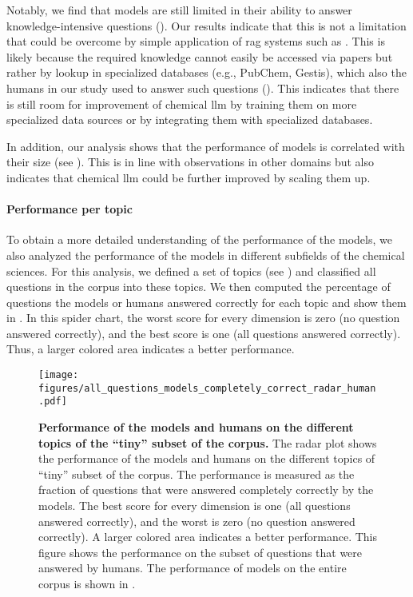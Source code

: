 \documentclass[11pt, oneside]{article}
\begin{document}
\begin{refsection}
Notably, we find that models are still limited in their ability to answer knowledge-intensive questions (). Our results indicate that this is not a limitation that could be overcome by simple application of \gls{rag} systems such as \PaperQATwo. This is likely because the required knowledge cannot easily be accessed via papers but rather by lookup in specialized databases (e.g., PubChem, Gestis), which also the humans in our study used to answer such questions ().
This indicates that there is still room for improvement of chemical \gls{llm} by training them on more specialized data sources or by integrating them with specialized databases.

In addition, our analysis shows that the performance of models is correlated with their size (see ). This is in line with observations in other domains but also indicates that chemical \gls{llm} could be further improved by scaling them up.

\paragraph{Performance per topic} To obtain a more detailed understanding of the performance of the models, we also analyzed the performance of the models in different subfields of the chemical sciences.
For this analysis, we defined a set of topics (see ) and  classified all questions in the \chembench corpus into these topics.
We then computed the percentage of questions the models or humans answered correctly for each topic and show them in .
In this spider chart, the worst score for every dimension is zero (no question answered correctly), and the best score is one (all questions answered correctly). Thus, a larger colored area indicates a better performance.

\begin{figure}[!h]
    \centering
    \texttt{[image: figures/all\_questions\_models\_completely\_correct\_radar\_human.pdf]}
    \caption{\textbf{Performance of the models and humans on the different topics of the \enquote{tiny} subset of the \chembench corpus.} The radar plot shows the performance of the models and humans on the different topics of \enquote{tiny} subset of the \chembench corpus. The performance is measured as the fraction of questions that were answered completely correctly by the models.
    The best score for every dimension is one (all questions answered correctly), and the worst is zero (no question answered correctly). A larger colored area indicates a better performance.
    This figure shows the performance on the subset of questions that were answered by humans. The performance of models on the entire corpus is shown in .
    }
    \label{fig:all_questions_models_completely_correct_radar_human}
\end{figure}


\end{refsection}
\end{document}

